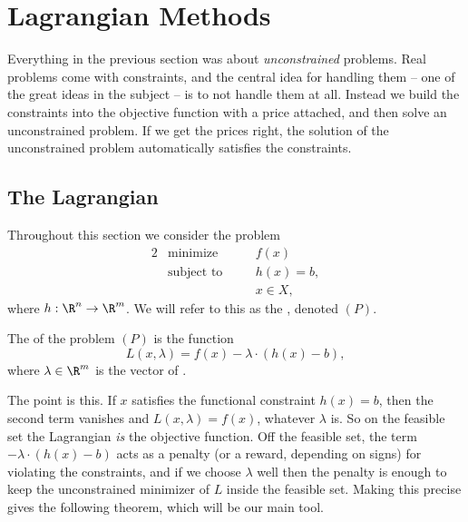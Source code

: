 \documentclass[a4paper]{scrartcl}
\begin{document}
\section{Lagrangian Methods}

Everything in the previous section was about \emph{unconstrained} problems. Real problems come with constraints, and the central idea for handling them -- one of the great ideas in the subject -- is to not handle them at all. Instead we build the constraints into the objective function with a price attached, and then solve an unconstrained problem. If we get the prices right, the solution of the unconstrained problem automatically satisfies the constraints.

\subsection{The Lagrangian}

Throughout this section we consider the problem
\begin{alignat*}{2}
    & \text{minimize} \quad && f(x) \\
    & \text{subject to} \quad && h(x) = b, \\
    & && x \in X,
\end{alignat*}
where $h : \R^n \rightarrow \R^m$. We will refer to this as the , denoted $(P)$.

\begin{definition}[Lagrangian]
    The  of the problem $(P)$ is the function
    $$
    L(x, \lambda) = f(x) - \lambda \cdot (h(x) - b),
    $$
    where $\lambda \in \R^m$ is the vector of .
\end{definition}

The point is this. If $x$ satisfies the functional constraint $h(x) = b$, then the second term vanishes and $L(x, \lambda) = f(x)$, whatever $\lambda$ is. So on the feasible set the Lagrangian \emph{is} the objective function. Off the feasible set, the term $-\lambda \cdot (h(x) - b)$ acts as a penalty (or a reward, depending on signs) for violating the constraints, and if we choose $\lambda$ well then the penalty is enough to keep the unconstrained minimizer of $L$ inside the feasible set. Making this precise gives the following theorem, which will be our main tool.
\end{document}
